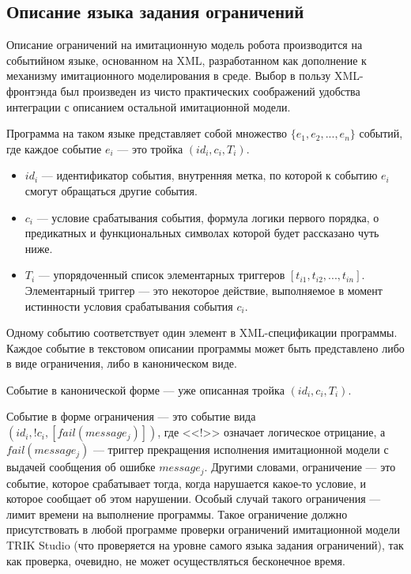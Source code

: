 \documentclass[conference]{IEEEtran}
\begin{document}
\subsection{Описание языка задания ограничений}
Описание ограничений на имитационную модель робота производится на событийном языке, основанном на XML, разработанном 
как дополнение к механизму имитационного моделирования в среде. Выбор в пользу XML-фронтэнда был произведен 
из чисто практических соображений удобства интеграции с описанием остальной имитационной модели.

Программа на таком языке представляет собой множество $\{ e_1, e_2, ..., e_n \}$ событий, где каждое событие 
$e_i$ --- это тройка $(id_i, c_i, T_i)$.

\begin{itemize}
	\item $id_i$ --- идентификатор события, внутренняя метка, по которой к событию $e_i$ смогут обращаться другие события.
	\item $c_i$ --- условие срабатывания события, формула логики первого порядка, о предикатных и функциональных символах которой будет рассказано чуть ниже.
	\item $T_i$ --- упорядоченный список элементарных триггеров $[ t_{i1}, t_{i2}, ..., t_{in} ]$. Элементарный триггер --- это некоторое 
			действие, выполняемое в момент истинности условия срабатывания события $c_i$.
\end{itemize}

Одному событию соответствует один элемент в XML-спецификации программы. Каждое событие в текстовом описании 
программы может быть представлено либо в виде ограничения, либо в каноническом виде.

Событие в канонической форме --- уже описанная тройка $(id_i, c_i, T_i)$.

Событие в форме ограничения --- это событие вида $(id_i, !c_i, [ fail(message_j) ])$, где <<!>> означает 
логическое отрицание, а $fail(message_j)$ --- триггер прекращения исполнения имитационной модели с выдачей 
сообщения об ошибке $message_j$. Другими словами, ограничение --- это событие, которое срабатывает тогда, 
когда нарушается какое-то условие, и которое сообщает об этом нарушении. Особый случай такого ограничения --- 
лимит времени на выполнение программы. Такое ограничение должно присутствовать в любой программе проверки 
ограничений имитационной модели TRIK Studio (что проверяется на уровне самого языка задания ограничений), 
так как проверка, очевидно, не может осуществляться бесконечное время. 
\end{document}
